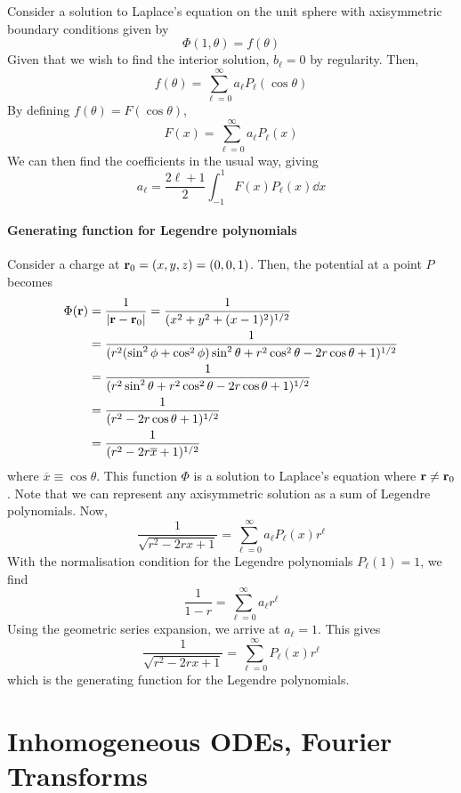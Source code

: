 \documentclass[a4paper]{article}
\begin{document}
Consider a solution to Laplace's equation on the unit sphere with axisymmetric boundary conditions given by
\[
	\Phi(1,\theta) = f(\theta)
\]
Given that we wish to find the interior solution, \( b_\ell = 0 \) by regularity.
Then,
\[
	f(\theta) = \sum_{\ell=0}^\infty a_\ell P_\ell(\cos\theta)
\]
By defining \( f(\theta) = F(\cos\theta) \),
\[
	F(x) = \sum_{\ell=0}^\infty a_\ell P_\ell(x)
\]
We can then find the coefficients in the usual way, giving
\[
	a_\ell = \frac{2\ell + 1}{2} \int_{-1}^1 F(x) P_{\ell}(x) \dd{x}
\]

\subsection{Generating function for Legendre polynomials}
Consider a charge at \( {\bf r}_0 = (x,y,z) = (0,0,1) \).
Then, the potential at a point \( P \) becomes
\begin{align*}
	\Phi({\bf r}) & = \frac{1}{\abs{{\bf r} - {\bf r}_0}} = \frac{1}{(x^2 + y^2 + (x-1)^2)^{1/2}}                                         \\
	        & = \frac{1}{(r^2 (\sin^2 \phi + \cos^2 \phi) \sin^2 \theta + r^2 \cos^2 \theta - 2r \cos\theta + 1)^{1/2}} \\
	        & = \frac{1}{(r^2 \sin^2 \theta + r^2 \cos^2 \theta - 2r \cos\theta + 1)^{1/2}}                             \\
	        & = \frac{1}{(r^2 - 2r \cos\theta + 1)^{1/2}}                                                               \\
	        & = \frac{1}{(r^2 - 2r \overline x + 1)^{1/2}}
\end{align*}
where \( \overline x \equiv \cos \theta \).
This function \( \Phi \) is a solution to Laplace's equation where \( {\bf r} \neq {\bf r}_0 \).
Note that we can represent any axisymmetric solution as a sum of Legendre polynomials.
Now,
\[
	\frac{1}{\sqrt{r^2 - 2rx + 1}} = \sum_{\ell = 0}^\infty a_\ell P_\ell(x) r^\ell
\]
With the normalisation condition for the Legendre polynomials \( P_\ell(1) = 1 \), we find
\[
	\frac{1}{1-r} = \sum_{\ell=0}^\infty a_\ell r^\ell
\]
Using the geometric series expansion, we arrive at \( a_\ell = 1 \).
This gives
\[
	\frac{1}{\sqrt{r^2 - 2rx + 1}} = \sum_{\ell = 0}^\infty P_\ell(x) r^\ell
\]
which is the generating function for the Legendre polynomials.

\clearpage
\part{Inhomogeneous ODEs, Fourier Transforms}
\end{document}
